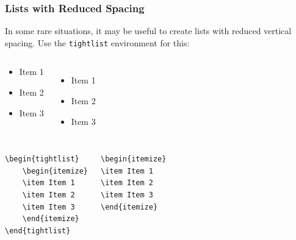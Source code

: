 \documentclass[utf8,aspectratio=169,ngerman,english]{beamer}
\begin{document}
\begin{frame}[containsverbatim]
\frametitle{Lists with Reduced Spacing}

In some rare situations, it may be useful to create lists with reduced vertical spacing. Use the \verb|tightlist| environment for this:

\begin{columns}[onlytextwidth,T]

\begin{tightlist}
    \begin{itemize}
    \item Item 1
    \item Item 2
    \item Item 3
    \end{itemize}
\end{tightlist}

\begin{itemize}
\item Item 1
\item Item 2
\item Item 3
\end{itemize}

\end{columns}

\bigskip
\begin{columns}[onlytextwidth,T]

\begin{lstlisting}[language={[LaTeX]TeX},numbers=none]
\begin{tightlist}
    \begin{itemize}
    \item Item 1
    \item Item 2
    \item Item 3
    \end{itemize}
\end{tightlist}
\end{lstlisting}

\begin{lstlisting}[language={[LaTeX]TeX},numbers=none]
\begin{itemize}
\item Item 1
\item Item 2
\item Item 3
\end{itemize}
\end{lstlisting}

\end{columns}
\end{frame}
\end{document}
